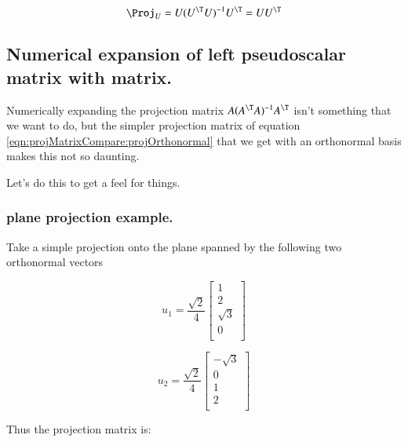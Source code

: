 \begin{equation}\label{eqn:projMatrixCompare:projOrthonormal}
\Proj_U = U (U^\T U)^{-1} U^\T = U U^\T
\end{equation}

\subsection{Numerical expansion of left pseudoscalar matrix with matrix.}

Numerically expanding the projection matrix $A (A^\T A)^{-1}A^\T$ isn't something
that we want to do, but the simpler projection matrix of equation
\ref{eqn:projMatrixCompare:projOrthonormal} that we get with an orthonormal basis makes this not so daunting.

Let's do this to get a feel for things.

\subsubsection{ plane projection example. }

Take a simple projection onto the plane spanned by the following two orthonormal vectors

\[
u_1 = 
\frac{\sqrt{2}}{4}
\begin{bmatrix}
1 \\
2 \\
\sqrt{3} \\
0 \\
\end{bmatrix}
\]

\[
u_2 = 
\frac{\sqrt{2}}{4}
\begin{bmatrix}
-\sqrt{3} \\
0 \\
1 \\
2 \\
\end{bmatrix}
\]

Thus the projection matrix is:

